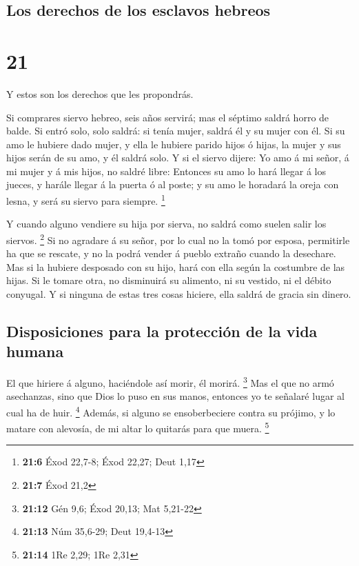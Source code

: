 \hypertarget{los-derechos-de-los-esclavos-hebreos}{%
\subsection{Los derechos de los esclavos
hebreos}\label{los-derechos-de-los-esclavos-hebreos}}

\hypertarget{section-20}{%
\section{21}\label{section-20}}

 Y estos son los derechos que les propondrás.

 Si comprares siervo hebreo, seis años servirá; mas el
séptimo saldrá horro de balde.  Si entró solo, solo saldrá:
si tenía mujer, saldrá él y su mujer con él.  Si su amo le
hubiere dado mujer, y ella le hubiere parido hijos ó hijas, la mujer y
sus hijos serán de su amo, y él saldrá solo.  Y si el siervo
dijere: Yo amo á mi señor, á mi mujer y á mis hijos, no saldré libre:
 Entonces su amo lo hará llegar á los jueces, y harále
llegar á la puerta ó al poste; y su amo le horadará la oreja con lesna,
y será su siervo para siempre. \footnote{\textbf{21:6} Éxod 22,7-8; Éxod
  22,27; Deut 1,17}

 Y cuando alguno vendiere su hija por sierva, no saldrá como
suelen salir los siervos. \footnote{\textbf{21:7} Éxod 21,2}
 Si no agradare á su señor, por lo cual no la tomó por
esposa, permitirle ha que se rescate, y no la podrá vender á pueblo
extraño cuando la desechare.  Mas si la hubiere desposado
con su hijo, hará con ella según la costumbre de las hijas.
 Si le tomare otra, no disminuirá su alimento, ni su
vestido, ni el débito conyugal.  Y si ninguna de estas tres
cosas hiciere, ella saldrá de gracia sin dinero.

\hypertarget{disposiciones-para-la-protecciuxf3n-de-la-vida-humana}{%
\subsection{Disposiciones para la protección de la vida
humana}\label{disposiciones-para-la-protecciuxf3n-de-la-vida-humana}}

 El que hiriere á alguno, haciéndole así morir, él morirá.
\footnote{\textbf{21:12} Gén 9,6; Éxod 20,13; Mat 5,21-22} 
Mas el que no armó asechanzas, sino que Dios lo puso en sus manos,
entonces yo te señalaré lugar al cual ha de huir. \footnote{\textbf{21:13}
  Núm 35,6-29; Deut 19,4-13}  Además, si alguno se
ensoberbeciere contra su prójimo, y lo matare con alevosía, de mi altar
lo quitarás para que muera. \footnote{\textbf{21:14} 1Re 2,29; 1Re 2,31}

